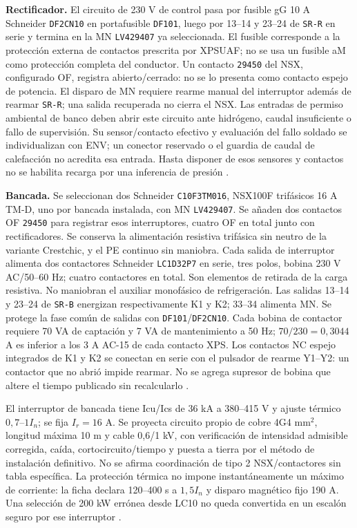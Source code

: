 \textbf{Rectificador.} El circuito de 230 V de control pasa por fusible gG 10 A Schneider \texttt{DF2CN10} en portafusible \texttt{DF101}, luego por 13--14 y 23--24 de \texttt{SR-R} en serie y termina en la MN \texttt{LV429407} ya seleccionada. El fusible corresponde a la protección externa de contactos prescrita por XPSUAF; no se usa un fusible aM como protección completa del conductor. Un contacto \texttt{29450} del NSX, configurado OF, registra abierto/cerrado: no se lo presenta como contacto espejo de potencia. El disparo de MN requiere rearme manual del interruptor además de rearmar \texttt{SR-R}; una salida recuperada no cierra el NSX. Las entradas de permiso ambiental de banco deben abrir este circuito ante hidrógeno, caudal insuficiente o fallo de supervisión. Su sensor/contacto efectivo y evaluación del fallo soldado se individualizan con ENV; un conector reservado o el guardia de caudal de calefacción no acredita esa entrada. Hasta disponer de esos sensores y contactos no se habilita recarga por una inferencia de presión \parencites[p.~22]{lote26-xpsmanual}{lote26-fusible10}{lote26-fuseholder}{lote26-of}[pp.~C-37 y F-38]{lote23-nsx2026}.

\textbf{Bancada.} Se seleccionan dos Schneider \texttt{C10F3TM016}, NSX100F trifásicos 16 A TM-D, uno por bancada instalada, con MN \texttt{LV429407}. Se añaden dos contactos OF \texttt{29450} para registrar esos interruptores, cuatro OF en total junto con rectificadores. Se conserva la alimentación resistiva trifásica sin neutro de la variante Crestchic, y el PE continuo sin maniobra. Cada salida de interruptor alimenta dos contactores Schneider \texttt{LC1D32P7} en serie, tres polos, bobina 230 V AC/50--60 Hz; cuatro contactores en total. Son elementos de retirada de la carga resistiva. No maniobran el auxiliar monofásico de refrigeración. Las salidas 13--14 y 23--24 de \texttt{SR-B} energizan respectivamente K1 y K2; 33--34 alimenta MN. Se protege la fase común de salidas con \texttt{DF101}/\texttt{DF2CN10}. Cada bobina de contactor requiere 70 VA de captación y 7 VA de mantenimiento a 50 Hz; $70/230=0,3044$ A es inferior a los 3 A AC-15 de cada contacto XPS. Los contactos NC espejo integrados de K1 y K2 se conectan en serie con el pulsador de rearme Y1--Y2: un contactor que no abrió impide rearmar. No se agrega supresor de bobina que altere el tiempo publicado sin recalcularlo \parencites[pp.~1--3]{lote26-contactor}[pp.~1--2]{lote26-nsx16}[p.~22]{lote26-xpsmanual}.

El interruptor de bancada tiene Icu/Ics de 36 kA a 380--415 V y ajuste térmico $0,7$--$1I_n$; se fija $I_r=16$ A. Se proyecta circuito propio de cobre 4G4 mm$^2$, longitud máxima 10 m y cable 0,6/1 kV, con verificación de intensidad admisible corregida, caída, cortocircuito/tiempo y puesta a tierra por el método de instalación definitivo. No se afirma coordinación de tipo 2 NSX/contactores sin tabla específica. La protección térmica no impone instantáneamente un máximo de corriente: la ficha declara 120--400 s a $1,5I_n$ y disparo magnético fijo 190 A. Una selección de 200 kW errónea desde LC10 no queda convertida en un escalón seguro por ese interruptor \parencite[pp.~1--2]{lote26-nsx16}.

